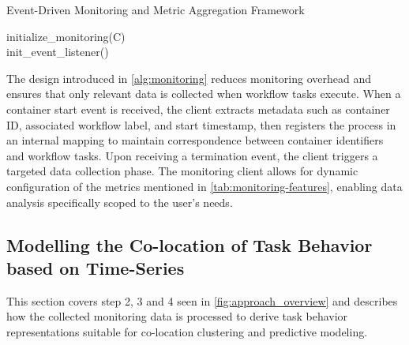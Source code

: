 \begin{algorithm}[H]
    \caption{Event-Driven Monitoring and Metric Aggregation Framework}
    \label{alg:monitoring}

    \BlankLine
    initialize\_monitoring(C)\\
    init\_event\_listener()\\
\end{algorithm}

The design introduced in \ref{alg:monitoring} reduces monitoring overhead and ensures that only relevant data is collected when workflow tasks execute. When a container start event is received, the client extracts metadata such as container ID, associated workflow label, and start timestamp, then registers the process in an internal mapping to maintain correspondence between container identifiers and workflow tasks. Upon receiving a termination event, the client triggers a targeted data collection phase. The monitoring client allows for dynamic configuration of the metrics mentioned in \ref{tab:monitoring-features}, enabling data analysis specifically scoped to the user's needs.

\subsection{Modelling the Co-location of Task Behavior based on Time-Series}
\label{sec:data_analysis}
This section covers step 2, 3 and 4 seen in \ref{fig:approach_overview} and describes how the collected monitoring data is processed to derive task behavior representations suitable for co-location clustering and predictive modeling.


